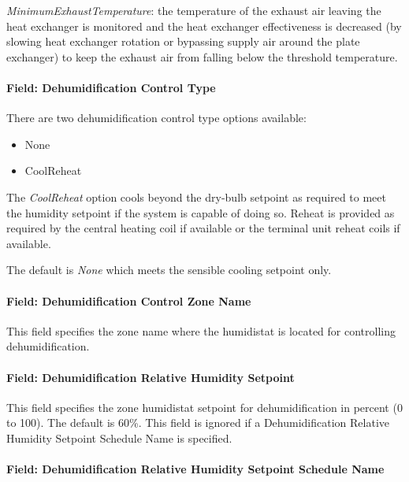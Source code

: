 \emph{MinimumExhaustTemperature}: the temperature of the exhaust air leaving the heat exchanger is monitored and the heat exchanger effectiveness is decreased (by slowing heat exchanger rotation or bypassing supply air around the plate exchanger) to keep the exhaust air from falling below the threshold temperature.

\paragraph{Field: Dehumidification Control Type}\label{field-dehumidification-control-type-5}

There are two dehumidification control type options available:

\begin{itemize}
\item
  None
\item
  CoolReheat
\end{itemize}

The \emph{CoolReheat} option cools beyond the dry-bulb setpoint as required to meet the humidity setpoint if the system is capable of doing so. Reheat is provided as required by the central heating coil if available or the terminal unit reheat coils if available.

The default is \emph{None} which meets the sensible cooling setpoint only.

\paragraph{Field: Dehumidification Control Zone Name}\label{field-dehumidification-control-zone-name-4}

This field specifies the zone name where the humidistat is located for controlling dehumidification.

\paragraph{Field: Dehumidification Relative Humidity Setpoint}\label{field-dehumidification-relative-humidity-setpoint-1}

This field specifies the zone humidistat setpoint for dehumidification in percent (0 to 100). The default is 60\%. This field is ignored if a Dehumidification Relative Humidity Setpoint Schedule Name is specified.

\paragraph{Field: Dehumidification Relative Humidity Setpoint Schedule Name}\label{field-dehumidification-relative-humidity-setpoint-schedule-name-1}

